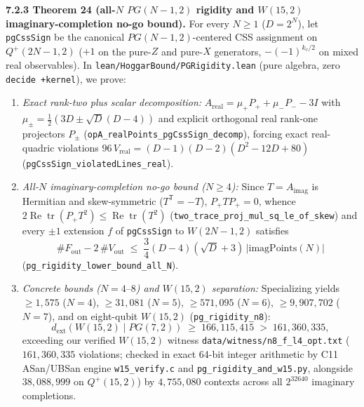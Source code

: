 \documentclass[11pt,a4paper]{article}
\providecommand{\tightlist}{\setlength{\itemsep}{0pt}\setlength{\parskip}{0pt}}
\begin{document}
\textbf{7.2.3 Theorem 24 (all-\(N\) \(PG(N-1,2)\) rigidity and \(W(15,2)\) imaginary-completion no-go bound).}
For every \(N \ge 1\) (\(D = 2^N\)), let \nolinkurl{pgCssSign} be the canonical \(PG(N-1,2)\)-centered CSS assignment on \(Q^+(2N-1,2)\) (\(+1\) on the pure-\(Z\) and pure-\(X\) generators, \(-(-1)^{k_v/2}\) on mixed real observables). In \nolinkurl{lean/HoggarBound/PGRigidity.lean} (pure algebra, zero \texttt{decide +kernel}), we prove:
\begin{enumerate}
\def\labelenumi{\arabic{enumi}.}
\tightlist
\item
  \emph{Exact rank-two plus scalar decomposition:} \(A_{\mathrm{real}} = \mu_+ P_+ + \mu_- P_- - 3I\) with \(\mu_\pm = \frac{1}{2}(3D \pm \sqrt{D}(D-4))\) and explicit orthogonal real rank-one projectors \(P_\pm\) (\nolinkurl{opA_realPoints_pgCssSign_decomp}), forcing exact real-quadric violations \(96\,V_{\mathrm{real}} = (D-1)(D-2)(D^2-12D+80)\) (\nolinkurl{pgCssSign_violatedLines_real}).
\item
  \emph{All-\(N\) imaginary-completion no-go bound (\(N \ge 4\)):} Since \(T = A_{\mathrm{imag}}\) is Hermitian and skew-symmetric (\(T^{\mathsf T} = -T\)), \(P_+ T P_+ = 0\), whence \(2\operatorname{Re}\operatorname{tr}(P_+ T^2) \le \operatorname{Re}\operatorname{tr}(T^2)\) (\nolinkurl{two_trace_proj_mul_sq_le_of_skew}) and every \(\pm 1\) extension \(f\) of \nolinkurl{pgCssSign} to \(W(2N-1,2)\) satisfies
  \[\#F_{\mathrm{out}} - 2\,\#V_{\mathrm{out}} \;\le\; \frac{3}{4}(D-4)(\sqrt{D}+3)\,|\mathrm{imagPoints}(N)|\]
  (\nolinkurl{pg_rigidity_lower_bound_all_N}).
\item
  \emph{Concrete bounds (\(N = 4\text{--}8\)) and \(W(15,2)\) separation:} Specializing yields \(\ge 1{,}575\) (\(N=4\)), \(\ge 31{,}081\) (\(N=5\)), \(\ge 571{,}095\) (\(N=6\)), \(\ge 9{,}907{,}702\) (\(N=7\)), and on eight-qubit \(W(15,2)\) (\nolinkurl{pg_rigidity_n8}):
  \[d_{\text{ext}}(W(15,2) \mid PG(7,2)) \;\ge\; 166{,}115{,}415 \;>\; 161{,}360{,}335,\]
  exceeding our verified \(W(15,2)\) witness \nolinkurl{data/witness/n8_f_l4_opt.txt} (\(161{,}360{,}335\) violations; checked in exact 64-bit integer arithmetic by C11 ASan/UBSan engine \nolinkurl{w15_verify.c} and \nolinkurl{pg_rigidity_and_w15.py}, alongside \(38{,}088{,}999\) on \(Q^+(15,2)\)) by \(4{,}755{,}080\) contexts across all \(2^{32640}\) imaginary completions.
\end{enumerate}
\end{document}
